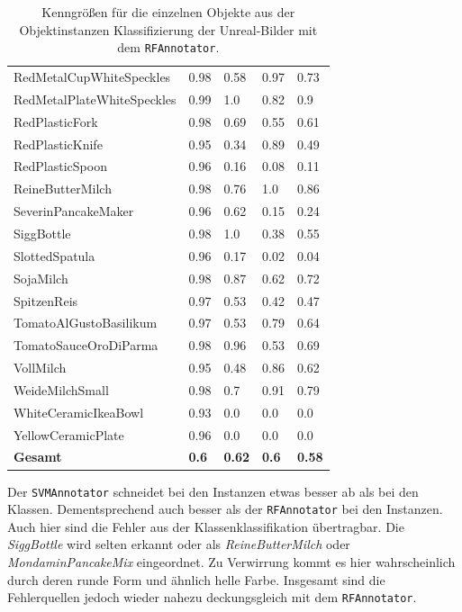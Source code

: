 \begin{table}
\begin{tabularx}{\textwidth}{Xllll}
RedMetalCupWhiteSpeckles & 0.98 & 0.58 & 0.97 & 0.73 \\  
RedMetalPlateWhiteSpeckles & 0.99 & 1.0 & 0.82 & 0.9 \\  
RedPlasticFork & 0.98 & 0.69 & 0.55 & 0.61 \\  
RedPlasticKnife & 0.95 & 0.34 & 0.89 & 0.49 \\  
RedPlasticSpoon & 0.96 & 0.16 & 0.08 & 0.11 \\  
ReineButterMilch & 0.98 & 0.76 & 1.0 & 0.86 \\  
SeverinPancakeMaker & 0.96 & 0.62 & 0.15 & 0.24 \\  
SiggBottle & 0.98 & 1.0 & 0.38 & 0.55 \\  
SlottedSpatula & 0.96 & 0.17 & 0.02 & 0.04 \\  
SojaMilch & 0.98 & 0.87 & 0.62 & 0.72 \\  
SpitzenReis & 0.97 & 0.53 & 0.42 & 0.47 \\  
TomatoAlGustoBasilikum & 0.97 & 0.53 & 0.79 & 0.64 \\  
TomatoSauceOroDiParma & 0.98 & 0.96 & 0.53 & 0.69 \\  
VollMilch & 0.95 & 0.48 & 0.86 & 0.62 \\  
WeideMilchSmall & 0.98 & 0.7 & 0.91 & 0.79 \\  
WhiteCeramicIkeaBowl & 0.93 & 0.0 & 0.0 & 0.0 \\  
YellowCeramicPlate & 0.96 & 0.0 & 0.0 & 0.0 \\   \hline
\textbf{Gesamt}		&	\textbf{0.6}   &	\textbf{0.62}  & \textbf{0.6}     &  \textbf{0.58}     \\
\end{tabularx}
\caption[Objektinstanzen-spezifische Kenngrößen des RFAnnotators]{Kenngrößen für die einzelnen Objekte aus der Objektinstanzen Klassifizierung der Unreal-Bilder mit dem \texttt{RFAnnotator}.}
\label{tab:RFClassifierGTInstance_metrics}
\end{table}

Der \texttt{SVMAnnotator} schneidet bei den Instanzen etwas besser ab als bei den Klassen. Dementsprechend auch besser als der \texttt{RFAnnotator} bei den Instanzen. Auch hier sind die Fehler aus der Klassenklassifikation übertragbar. Die \textit{SiggBottle} wird selten erkannt oder als \textit{ReineButterMilch} oder \textit{MondaminPancakeMix} eingeordnet. Zu Verwirrung kommt es hier wahrscheinlich durch deren runde Form und ähnlich helle Farbe. Insgesamt sind die Fehlerquellen jedoch wieder nahezu deckungsgleich mit dem \texttt{RFAnnotator}.

